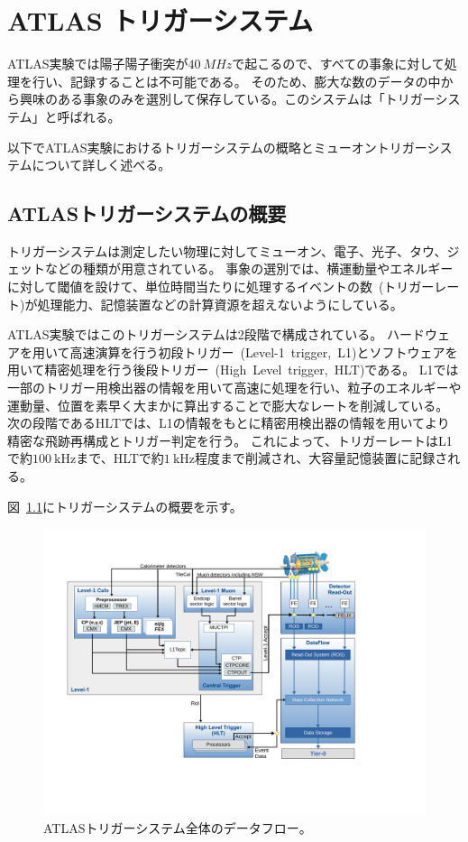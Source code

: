 \chapter{ATLAS トリガーシステム}\label{chapter3}
ATLAS実験では陽子陽子衝突が$\SI{40}{MHz}$で起こるので、すべての事象に対して処理を行い、記録することは不可能である。
そのため、膨大な数のデータの中から興味のある事象のみを選別して保存している。このシステムは「トリガーシステム」と呼ばれる。

以下でATLAS実験におけるトリガーシステムの概略とミューオントリガーシステムについて詳しく述べる。

\section{ATLASトリガーシステムの概要}\label{chapter3-1}
トリガーシステムは測定したい物理に対してミューオン、電子、光子、タウ、ジェットなどの種類が用意されている。
事象の選別では、横運動量やエネルギーに対して閾値を設けて、単位時間当たりに処理するイベントの数~(トリガーレート)が処理能力、記憶装置などの計算資源を超えないようにしている。

ATLAS実験ではこのトリガーシステムは2段階で構成されている。
ハードウェアを用いて高速演算を行う初段トリガー~(Level-1~trigger,~L1)とソフトウェアを用いて精密処理を行う後段トリガー~(High~Level~trigger,~HLT)である。
L1では一部のトリガー用検出器の情報を用いて高速に処理を行い、粒子のエネルギーや運動量、位置を素早く大まかに算出することで膨大なレートを削減している。
次の段階であるHLTでは、L1の情報をもとに精密用検出器の情報を用いてより精密な飛跡再構成とトリガー判定を行う。
これによって、トリガーレートはL1で約$\SI{100}{\kHz}$まで、HLTで約$\SI{1}{\kHz}$程度まで削減され、大容量記憶装置に記録される。

図~\ref{fig:3-1}にトリガーシステムの概要を示す。

\begin{figure}[H]
  \centering
  \includegraphics[clip, width=14cm]{fig/3/tdaq-run3-schematic.pdf}
  \caption{ATLASトリガーシステム全体のデータフロー\cite{article:approvedPlotsDAQ}。}
  \label{fig:3-1}
\end{figure}

